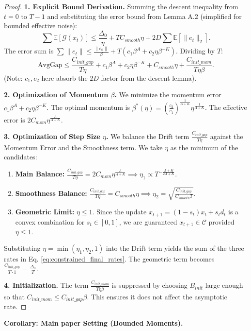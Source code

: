 \documentclass{article}
\theoremstyle{plain}
\theoremstyle{definition}
\theoremstyle{remark}
\begin{document}
\begin{proof}
\textbf{1. Explicit Bound Derivation.}
Summing the descent inequality from $t=0$ to $T-1$ and substituting the error bound from Lemma A.2 (simplified for bounded effective noise):
$$ \sum \mathbb{E}[\mathcal{G}(x_t)] \le \frac{\Delta_0}{\eta} + T C_{smooth} \eta + 2D \sum \mathbb{E}[\|e_t\|_2]. $$
The error sum is $\sum \|e_t\| \le \frac{\|e_0\|}{\beta} + T (c_1 \beta^A + c_2 \eta \beta^{-K})$.
Dividing by $T$:
$$ \text{AvgGap} \le \frac{C_{init\_gap}}{T \eta} + c_1 \beta^A + c_2 \eta \beta^{-K} + C_{smooth} \eta + \frac{C_{init\_mom}}{T \eta \beta}. $$
(Note: $c_1, c_2$ here absorb the $2D$ factor from the descent lemma).

\textbf{2. Optimization of Momentum $\beta$.}
We minimize the momentum error $c_1 \beta^A + c_2 \eta \beta^{-K}$.
The optimal momentum is $\beta^*(\eta) = (\frac{c_2}{c_1})^{\frac{1}{A+K}} \eta^{\frac{1}{A+K}}$.
The effective error is $2 C_{mom} \eta^{\frac{A}{A+K}}$.

\textbf{3. Optimization of Step Size $\eta$.}
We balance the Drift term $\frac{C_{init\_gap}}{T \eta}$ against the Momentum Error and the Smoothness term. We take $\eta$ as the minimum of the candidates:
\begin{enumerate}
    \item \textbf{Main Balance:} $\frac{C_{init\_gap}}{T \eta} = 2 C_{mom} \eta^{\frac{A}{A+K}} \implies \eta_1 \propto T^{-\frac{A+K}{2A+K}}$.
    \item \textbf{Smoothness Balance:} $\frac{C_{init\_gap}}{T \eta} = C_{smooth} \eta \implies \eta_2 = \sqrt{\frac{C_{init\_gap}}{C_{smooth} T}}$.
    \item \textbf{Geometric Limit:} $\eta \le 1$. Since the update $x_{t+1} = (1-s_t)x_t + s_t d_t$ is a convex combination for $s_t \in [0,1]$, we are guaranteed $x_{t+1} \in \mathcal{C}$ provided $\eta \le 1$.
\end{enumerate}
Substituting $\eta = \min(\eta_1, \eta_2, 1)$ into the Drift term yields the sum of the three rates in Eq. \eqref{eq:constrained_final_rates}. The geometric term becomes $\frac{C_{init\_gap}}{T \cdot 1} = \frac{\Delta_0}{T}$.

\textbf{4. Initialization.}
The term $\frac{C_{init\_mom}}{T \eta \beta}$ is suppressed by choosing $B_{init}$ large enough so that $C_{init\_mom} \le C_{init\_gap} \beta$. This ensures it does not affect the asymptotic rate.
\end{proof}

\textbf{Corollary: Main paper Setting (Bounded Moments).}
\end{document}
